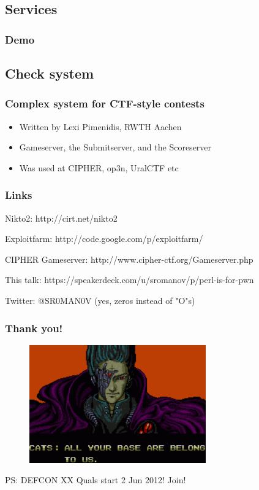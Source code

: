 \documentclass{beamer}
\begin{document}
\subsection{Services}
\frame
{
\frametitle{Demo}
}

\subsection{Check system}
\frame
{
\frametitle{Complex system for CTF-style contests}
\begin{itemize}
\item<1-> Written by Lexi Pimenidis, RWTH Aachen
\item<1-> Gameserver, the Submitserver, and the Scoreserver
\item<1-> Was used at CIPHER, op3n, UralCTF	etc
\end{itemize}
}

\frame
{
\frametitle{Links}
\item Nikto2: http://cirt.net/nikto2
\item Exploitfarm: http://code.google.com/p/exploitfarm/
\item CIPHER Gameserver: http://www.cipher-ctf.org/Gameserver.php
\item This talk: https://speakerdeck.com/u/sromanov/p/perl-is-for-pwn
\item Twitter: @SR0MAN0V (yes, zeros instead of "O"s)
}

\frame
{
\frametitle{Thank you!}
\begin{figure}
\includegraphics[width=3in,height=2in]{pics/aybabtu.png}
\end{figure}

PS: DEFCON XX Quals start 2 Jun 2012! Join!
}
\end{document}
